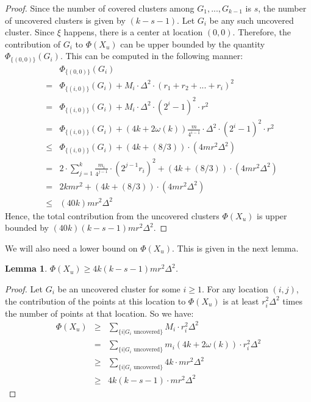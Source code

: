 \documentclass[11pt]{article}
\newtheorem{lemma}[theorem]{Lemma}
\begin{document}
\begin{proof}
Since the number of covered clusters among $G_1, ..., G_{k-1}$ is $s$, the number of uncovered clusters is given by $(k-s-1)$.
Let $G_i$ be any such uncovered cluster.
Since $\xi$ happens, there is a center at location $(0, 0)$.
Therefore, the contribution of $G_i$ to $\Phi(X_u)$ can be upper bounded by the quantity $\Phi_{\{(0, 0)\}}(G_i)$. 
This can be computed in the following manner:
\begin{eqnarray*}
&&\Phi_{\{(0, 0)\}}(G_i)\\
&=& \Phi_{\{(i, 0)\}}(G_i) + M_i \cdot \Delta^2  \cdot (r_1 + r_2 + ... + r_i)^2 \\
&=& \Phi_{\{(i, 0)\}}(G_i) + M_i \cdot \Delta^2 \cdot (2^i - 1)^2 \cdot r^2 \\
&=& \Phi_{\{(i, 0)\}}(G_i) + (4k + 2 \omega(k)) \frac{m}{4^{i-1}} \cdot \Delta^2 \cdot (2^i - 1)^2 \cdot r^2 \\
&\leq& \Phi_{\{(i, 0)\}}(G_i) + (4k + (8/3)) \cdot (4 m r^2 \Delta^2) \\
&=& 2 \cdot \sum_{j=1}^{k} \frac{m_i}{4^{j-1}} \cdot (2^{j-1}r_i)^2 + (4k + (8/3)) \cdot (4 m r^2 \Delta^2) \\
&=& 2 k m r^2 + (4k + (8/3)) \cdot (4 m r^2 \Delta^2) \\
&\leq& (40 k) m r^2 \Delta^2
\end{eqnarray*}
Hence, the total contribution from the uncovered clusters $\Phi(X_u)$ is upper bounded by 
$(40 k) (k-s-1)m r^2 \Delta^2$.
\end{proof}

We will also need a lower bound on $\Phi(X_u)$. This is given in the next lemma.

\begin{lemma}\label{lemma:13}
$\Phi(X_u) \geq 4k (k-s-1) m r^2 \Delta^2$.
\end{lemma}
\begin{proof}
Let $G_i$ be an uncovered cluster for some $i \geq 1$.
For any location $(i, j)$, the contribution of the points at this location to $\Phi(X_u)$ is at least $r_i^2 \Delta^2$ times the number of points at that location. So we have:
\begin{eqnarray*}
\Phi(X_u) &\geq& \sum_{\{i | G_i \textrm{ uncovered}\}} M_i \cdot r_i^2 \Delta^2 \\
&=& \sum_{\{i | G_i \textrm{ uncovered}\}} m_i (4k + 2 \omega(k)) \cdot r_i^2 \Delta^2 \\
&\geq& \sum_{\{i | G_i \textrm{ uncovered}\}} 4k \cdot m r^2 \Delta^2 \\
&\geq& 4k (k-s-1) \cdot m r^2 \Delta^2
\end{eqnarray*}
\end{proof}
\end{document}
